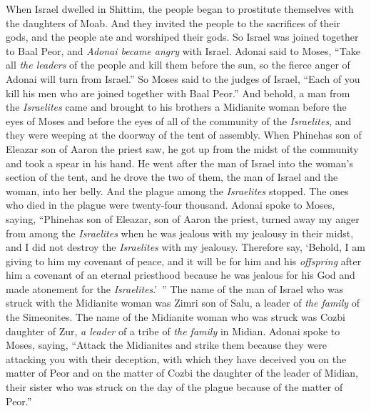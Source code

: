 \begin{biblechapter} %
 When Israel dwelled in Shittim, the people began to prostitute themselves with the daughters of Moab.
\verse And they invited the people to the sacrifices of their gods, and the people ate and worshiped their gods.
\verse So Israel was joined together to Baal Peor, and \textit{Adonai became angry} with Israel.
\verse Adonai said to Moses, “Take all \textit{the leaders} of the people and kill them before the sun, so the fierce anger of Adonai will turn from Israel.”
\verse So Moses said to the judges of Israel, “Each of you kill his men who are joined together with Baal Peor.”
\verse And behold, a man from the \textit{Israelites} came and brought to his brothers a Midianite woman before the eyes of Moses and before the eyes of all of the community of the \textit{Israelites}, and they were weeping at the doorway of the tent of assembly.
\verse When Phinehas son of Eleazar son of Aaron the priest saw, he got up from the midst of the community and took a spear in his hand.
\verse He went after the man of Israel into the woman’s section of the tent, and he drove the two of them, the man of Israel and the woman, into her belly. And the plague among the \textit{Israelites} stopped.
\verse The ones who died in the plague were twenty-four thousand.
\verse Adonai spoke to Moses, saying,
\verse “Phinehas son of Eleazar, son of Aaron the priest, turned away my anger from among the \textit{Israelites} when he was jealous with my jealousy in their midst, and I did not destroy the \textit{Israelites} with my jealousy.
\verse Therefore say, ‘Behold, I am giving to him my covenant of peace,
\verse and it will be for him and his \textit{offspring} after him a covenant of an eternal priesthood because he was jealous for his God and made atonement for the \textit{Israelites}.’ ”
\verse The name of the man of Israel who was struck with the Midianite woman was Zimri son of Salu, a leader of \textit{the family} of the Simeonites.
\verse The name of the Midianite woman who was struck was Cozbi daughter of Zur, \textit{a leader} of a tribe of \textit{the family} in Midian.
\verse Adonai spoke to Moses, saying,
\verse “Attack the Midianites and strike them
\verse because they were attacking you with their deception, with which they have deceived you on the matter of Peor and on the matter of Cozbi the daughter of the leader of Midian, their sister who was struck on the day of the plague because of the matter of Peor.”
\end{biblechapter}

